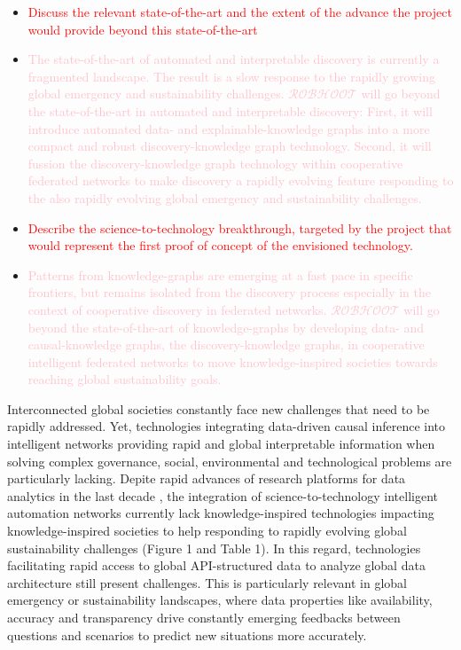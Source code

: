 \documentclass[11pt, a4paper]{article} %
\begin{document}
\begin{itemize}
\item \textcolor{red}{Discuss the relevant state-of-the-art and the
    extent of the advance the project would provide beyond this
    state-of-the-art}
\item \textcolor{pink}{The state-of-the-art of automated and
    interpretable discovery is currently a fragmented landscape. The
    result is a slow response to the rapidly growing global emergency
    and sustainability challenges. $\mathcal{ROBHOOT}$ will go beyond
    the state-of-the-art in automated and interpretable discovery:
    First, it will introduce automated data- and explainable-knowledge
    graphs into a more compact and robust discovery-knowledge graph
    technology. Second, it will fussion the discovery-knowledge graph
    technology within cooperative federated networks to make discovery
    a rapidly evolving feature responding to the also rapidly evolving
    global emergency and sustainability challenges.}
\item \textcolor{red}{Describe the science-to-technology breakthrough,
    targeted by the project that would represent the first proof of
    concept of the envisioned technology.}
\item \textcolor{pink}{Patterns from knowledge-graphs are emerging at
    a fast pace in specific frontiers, but remains isolated from the
    discovery process especially in the context of cooperative
    discovery in federated networks. $\mathcal{ROBHOOT}$ will go
    beyond the state-of-the-art of knowledge-graphs by developing
    data- and causal-knowledge graphs, the discovery-knowledge graphs,
    in cooperative intelligent federated networks to move
    knowledge-inspired societies towards reaching global
    sustainability goals.}
\end{itemize}

Interconnected global societies constantly face new challenges that
need to be rapidly addressed. Yet, technologies integrating
data-driven causal inference into intelligent networks providing rapid
and global interpretable information when solving complex governance,
social, environmental and technological problems are particularly
lacking. Depite rapid advances of research platforms for data
analytics in the last decade
\citep{Melniketal:2010,Steinruecken,Modulos,Guimera2020,GoogleAI,IrisAI,easeml,datarobot,aito},
the integration of science-to-technology intelligent automation
networks currently lack knowledge-inspired technologies impacting
knowledge-inspired societies to help responding to rapidly evolving
global sustainability challenges (Figure 1 and Table 1). In this
regard, technologies facilitating rapid access to global
API-structured data to analyze global data architecture still present
challenges. This is particularly relevant in global emergency or
sustainability landscapes, where data properties like availability,
accuracy and transparency drive constantly emerging feedbacks between
questions and scenarios to predict new situations more accurately.
\end{document}
